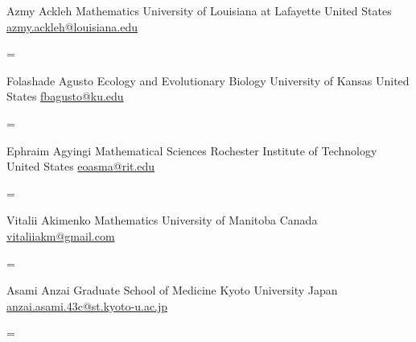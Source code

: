\documentclass[
  letterpaper,
  DIV=11,
  numbers=noendperiod]{scrartcl}
\newenvironment{absolutelynopagebreak}
  {\par\nobreak\vfil\penalty0\vfilneg
   \vtop\bgroup}
  {\par\xdef\tpd{\the\prevdepth}\egroup
   \prevdepth=\tpd}
\begin{document}
\begin{absolutelynopagebreak}Azmy   Ackleh \newline
\mbox{}\quad  Mathematics \newline
\mbox{}\quad  University of Louisiana at Lafayette \newline
\mbox{}\quad  United States \newline
\mbox{}\quad \href{mailto: azmy.ackleh@louisiana.edu }{ azmy.ackleh@louisiana.edu }
\end{absolutelynopagebreak}\vskip0.2cm
\begin{absolutelynopagebreak}Folashade   Agusto \newline
\mbox{}\quad  Ecology and Evolutionary Biology \newline
\mbox{}\quad  University of Kansas \newline
\mbox{}\quad  United States \newline
\mbox{}\quad \href{mailto: fbagusto@ku.edu }{ fbagusto@ku.edu }
\end{absolutelynopagebreak}\vskip0.2cm
\begin{absolutelynopagebreak}Ephraim   Agyingi \newline
\mbox{}\quad  Mathematical Sciences \newline
\mbox{}\quad  Rochester Institute of Technology \newline
\mbox{}\quad  United States \newline
\mbox{}\quad \href{mailto: eoasma@rit.edu }{ eoasma@rit.edu }
\end{absolutelynopagebreak}\vskip0.2cm
\begin{absolutelynopagebreak}Vitalii   Akimenko \newline
\mbox{}\quad  Mathematics \newline
\mbox{}\quad  University of Manitoba \newline
\mbox{}\quad  Canada \newline
\mbox{}\quad \href{mailto: vitaliiakm@gmail.com }{ vitaliiakm@gmail.com }
\end{absolutelynopagebreak}\vskip0.2cm
\begin{absolutelynopagebreak}Asami   Anzai \newline
\mbox{}\quad  Graduate School of Medicine \newline
\mbox{}\quad  Kyoto University \newline
\mbox{}\quad  Japan \newline
\mbox{}\quad \href{mailto: anzai.asami.43c@st.kyoto-u.ac.jp }{ anzai.asami.43c@st.kyoto-u.ac.jp }
\end{absolutelynopagebreak}\vskip0.2cm
\end{document}
